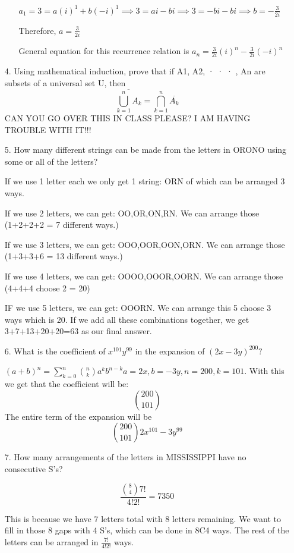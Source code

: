 \documentclass[letterpaper,11pt]{article}
\begin{document}
\begin{enumerate}
\begin{enumerate}
        \item[] $a_1 = 3 = a(i)^1 + b(-i)^1 \implies 3 = ai -bi \implies 3 = -bi-bi \implies b = -\frac{3}{2i}$
        \item[] Therefore, $a = \frac{3}{2i}$
        \item[] General equation for this recurrence relation is $a_n = \frac{3}{2i}(i)^n - \frac{3}{2i}(-i)^n$     
    \end{enumerate} 
    \item[4.] Using mathematical induction, prove that if A1, A2, · · · , An are subsets of a universal set U, then
    $$\overline{\bigcup_{k=1}^{n}A_k} = \bigcap_{k=1}^{n}\overline{A_k}$$
    CAN YOU GO OVER THIS IN CLASS PLEASE? I AM HAVING TROUBLE WITH IT!!!
    \newpage
    \item[5.] How many different strings can be made from the letters in ORONO using some or all of the letters?
    \item[] If we use 1 letter each we only get 1 string: ORN of which can be arranged 3 ways.
    \item[] If we use 2 letters, we can get: OO,OR,ON,RN. We can arrange those (1+2+2+2 = 7 different ways.)
    \item[] If we use 3 letters, we can get: OOO,OOR,OON,ORN. We can arrange those (1+3+3+6 = 13 different ways.)
    \item[] If we use 4 letters, we can get: OOOO,OOOR,OORN. We can arrange those (4+4+4 choose 2 = 20)
    \item[] IF we use 5 letters, we can get: OOORN. We can arrange this 5 choose 3 ways which is 20. If we add all these combinations together, we get 3+7+13+20+20=63 as our final answer.
    \item[6.]  What is the coefficient of $x^{101}y^{99}$ in the expansion of $(2x-3y)^{200}?$
    \item[] $(a+b)^n = \sum_{k=0}^{n} {n \choose k}a^kb^{n-k} a=2x, b=-3y, n=200, k=101$. With this we get that the coefficient will be: $${{200} \choose {101}}$$ The entire term of the expansion will be $${{200} \choose {101}} 2x^{101}-3y^{99}$$
    \item[7.] How many arrangements of the letters in MISSISSIPPI have no consecutive S's?
    \item[] $$\frac{{8 \choose 4}7!}{4!2!} = 7350$$
    \item[] This is because we have 7 letters total with 8 letters remaining. We want to fill in those 8 gaps with 4 S's, which can be done in 8C4 ways. The rest of the letters can be arranged in $\frac{7!}{4!2!}$ ways.

\end{enumerate}
\end{document}
